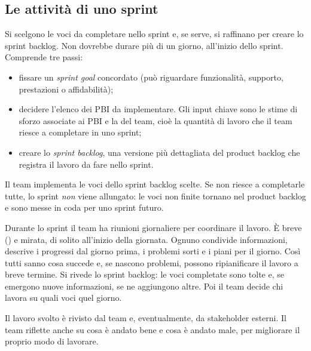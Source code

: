 \subsection*{Le attività di uno sprint}

\begin{description}[leftmargin=0pt, style=unboxed]
  \item[Sprint planning.] Si scelgono le voci da completare nello sprint e, se serve, si raffinano per creare lo
    sprint backlog. Non dovrebbe durare più di un giorno, all'inizio dello sprint. Comprende tre passi:
    \begin{itemize}
      \item fissare un \emph{sprint goal} concordato (può riguardare funzionalità, supporto, prestazioni o
        affidabilità);
      \item decidere l'elenco dei PBI da implementare. Gli input chiave sono le stime di sforzo associate ai PBI
        e la  del team, cioè la quantità di lavoro che il team riesce a completare in uno sprint;
      \item creare lo \emph{sprint backlog}, una versione più dettagliata del product backlog che registra il lavoro
        da fare nello sprint.
    \end{itemize}
  \item[Sprint execution.] Il team implementa le voci dello sprint backlog scelte. Se non riesce a completarle
    tutte, lo sprint \emph{non} viene allungato: le voci non finite tornano nel product backlog e sono messe in coda per
    uno sprint futuro.
  \item[Scrum quotidiano.] Durante lo sprint il team ha riunioni giornaliere per coordinare il lavoro. È breve
    () e mirata, di solito all'inizio della giornata. Ognuno condivide informazioni, descrive i
    progressi dal giorno prima, i problemi sorti e i piani per il giorno. Così tutti sanno cosa succede e, se nascono
    problemi, possono ripianificare il lavoro a breve termine. Si rivede lo sprint backlog: le voci completate
    sono tolte e, se emergono nuove informazioni, se ne aggiungono altre. Poi il team decide chi lavora su quali
    voci quel giorno.
  \item[Sprint reviewing.] Il lavoro svolto è rivisto dal team e, eventualmente, da stakeholder esterni. Il team
    riflette anche su cosa è andato bene e cosa è andato male, per migliorare il proprio modo di lavorare.
\end{description}

